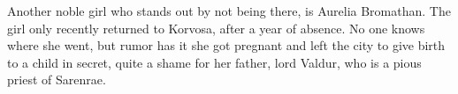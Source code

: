 Another noble girl who stands out by not being there, is Aurelia Bromathan. The girl only recently returned to Korvosa, after a year of absence. No one knows where she went, but rumor has it she got pregnant and left the city to give birth to a child in secret, quite a shame for her father, lord Valdur, who is a pious priest of Sarenrae.\\

